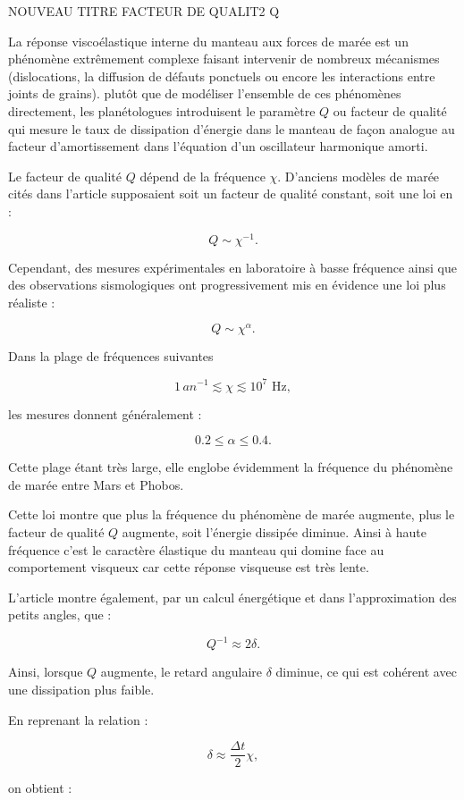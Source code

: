 \documentclass[12pt,a4paper]{article}
\begin{document}
NOUVEAU TITRE FACTEUR DE QUALIT2 Q 

    La réponse viscoélastique interne du manteau aux forces de marée est un phénomène extrêmement complexe faisant intervenir de nombreux mécanismes (dislocations, la diffusion de défauts ponctuels ou encore les interactions entre joints de grains). plutôt que de modéliser l'ensemble de ces phénomènes directement, les planétologues introduisent le paramètre $Q$ ou facteur de qualité qui mesure le taux de dissipation d'énergie dans le manteau de façon analogue au facteur d'amortissement dans l'équation d'un oscillateur harmonique amorti. 

    Le facteur de qualité $Q$ dépend de la fréquence $\chi$. D’anciens modèles de marée cités dans l'article supposaient soit un facteur de qualité constant, soit une loi en :

\[
Q \sim \chi^{-1}.
\]

Cependant, des mesures expérimentales en laboratoire à basse fréquence ainsi que des observations sismologiques ont progressivement mis en évidence une loi plus réaliste :

\[
Q \sim \chi^\alpha.
\]

Dans la plage de fréquences suivantes 

\[
1\,an^{-1} \lesssim \chi \lesssim 10^7 \text{ Hz},
\]

les mesures donnent généralement :

\[
0.2 \leq \alpha \leq 0.4.
\]

Cette plage étant très large, elle englobe évidemment la fréquence du phénomène de marée entre Mars et Phobos. 

Cette loi montre que plus la fréquence du phénomène de marée augmente, plus le facteur de qualité $Q$ augmente, soit l'énergie dissipée diminue. Ainsi à haute fréquence c'est le caractère élastique du manteau qui domine face au comportement visqueux car cette réponse visqueuse est très lente.

L’article montre également, par un calcul énergétique et dans l’approximation des petits angles, que :

\[
Q^{-1}\approx 2\delta.
\]

Ainsi, lorsque $Q$ augmente, le retard angulaire $\delta$ diminue, ce qui est cohérent avec une dissipation plus faible.

En reprenant la relation :

\[
\delta \approx \frac{\Delta t}{2}\chi,
\]

on obtient :
\end{document}
